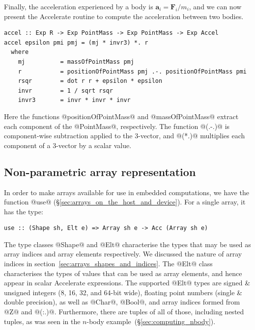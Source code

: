 Finally, the acceleration experienced by a body is $\mathbf{a}_i =
\mathbf{F}_i/m_i$, and we can now present the Accelerate routine to compute the
acceleration between two bodies.
%
%
%
\begin{lstlisting}[style=haskell]
accel :: Exp R -> Exp PointMass -> Exp PointMass -> Exp Accel
accel epsilon pmi pmj = (mj * invr3) *. r
  where
    mj          = massOfPointMass pmj
    r           = positionOfPointMass pmj .-. positionOfPointMass pmi
    rsqr        = dot r r + epsilon * epsilon
    invr        = 1 / sqrt rsqr
    invr3       = invr * invr * invr
\end{lstlisting}
%
Here the functions @positionOfPointMass@ and @massOfPointMass@ extract each
component of the @PointMass@, respectively. The function @(.-.)@ is
component-wise subtraction applied to the 3-vector, and @(*.)@ multiplies each
component of a 3-vector by a scalar value.


\subsection{Non-parametric array representation}

In order to make arrays available for use in embedded computations, we have the
function @use@ (\S\ref{sec:arrays_on_the_host_and_device}). For a single array,
it has the type:
%
\begin{lstlisting}[style=haskell]
use :: (Shape sh, Elt e) => Array sh e -> Acc (Array sh e)
\end{lstlisting}
%
The type classes @Shape@ and @Elt@ characterise the types that may be used as
array indices and array elements respectively. We discussed the nature of array
indices in section~\ref{sec:arrays_shapes_and_indices}. The @Elt@ class
characterises the types of values that can be used as array elements, and hence
appear in scalar Accelerate expressions. The supported @Elt@ types are signed \&
unsigned integers (8, 16, 32, and 64-bit wide), floating point numbers (single
\& double precision), as well as @Char@, @Bool@, and array indices formed from
@Z@ and @(:.)@. Furthermore, there are tuples of all of those, including nested
tuples, as was seen in the $n$-body example~(\S\ref{sec:computing_nbody}).

